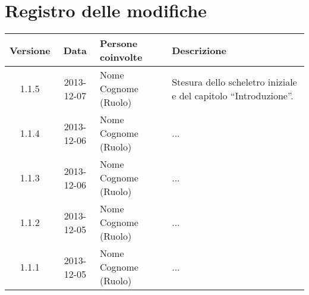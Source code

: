 \section*{Registro delle modifiche}

\small{
\begin{tabularx}{\textwidth}{|c|c|l|X|}
 \hline \textbf{Versione} & \textbf{Data} & \textbf{Persone coinvolte} & \textbf{Descrizione} \\

 
 \hline 1.1.5 & 2013-12-07 & Nome Cognome (Ruolo) &
 Stesura dello scheletro iniziale e del capitolo ``Introduzione''.\\

 \hline 1.1.4 & 2013-12-06 & Nome Cognome (Ruolo) &
 ...\\

 \hline 1.1.3 & 2013-12-06 & Nome Cognome (Ruolo) &
 ...\\

 \hline 1.1.2 & 2013-12-05 & Nome Cognome (Ruolo) &
 ...\\

 \hline 1.1.1 & 2013-12-05 & Nome Cognome (Ruolo) &
 ...\\

 \hline
\end{tabularx}
}
